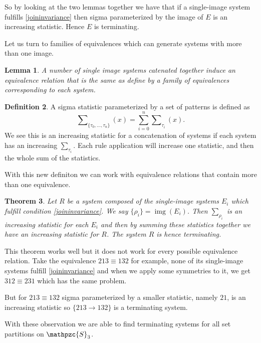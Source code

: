 \documentclass[a4paper, 11pt]{article}
\newtheorem{theorem}{Theorem}[section]
\newtheorem{lemma}[theorem]{Lemma}
\theoremstyle{definition}
\newtheorem{definition}[theorem]{Definition}
\newcommand{\Sym}{\mathpzc{S}}
\DeclareMathOperator{\img}{img}
\begin{document}
So by looking at the two lemmas together we have that if a single-image system
fulfills \eqref{joininvariance} then sigma parameterized by the image of $E$ is
an increasing statistic. Hence $E$ is terminating.

Let us turn to families of equivalences which can generate systems with more
than one image.

\begin{lemma}
    A number of single image systems catenated together induce an equivalence
    relation that is the same as define by a family of equivalences
    corresponding to each system.
\end{lemma}

\begin{definition}
    A sigma statistic parameterized by a set of patterns is defined as
    $$
        \sum\nolimits_{\{\tau_0, ..., \tau_n\}}(x) = \sum_{i=0}^{n} \sum\nolimits_{\tau_i}(x).
    $$
    We see this is an increasing statistic for a concatenation of systems if
    each system has an increasing $\sum_{\tau_i}$.  Each rule application will
    increase one statistic, and then the whole sum of the statistics.
\end{definition}

With this new definiton we can work with equivalence relations that contain more than one
equivalence.

\begin{theorem}
    Let $R$ be a system composed of the single-image systems $E_i$ which fulfill
    condition \eqref{joininvariance}. We say $\{\rho_i\} = \img(E_i)$. Then $\sum\nolimits_{\rho_i}$ 
    is an increasing statistic for each $E_i$ and then by summing these
    statistics together we have an increasing statistic for $R$.
    The system $R$ is hence terminating.
\end{theorem}

This theorem works well but it does not work for every possible equivalence relation.
Take the equivalence $213 \equiv 132$ for example, none of its single-image systems fulfill
\eqref{joininvariance} and when we apply some symmetries to it, we get $312
\equiv 231$ which has the same problem.

But for $213 \equiv 132$ sigma parameterized by a smaller statistic, namely $21$, is an
increasing statistic so $\{ 213 \to 132 \}$ is a terminating system.

With these observation we are able to find terminating systems for all set
partitions on $\Sym_3$.
\end{document}
